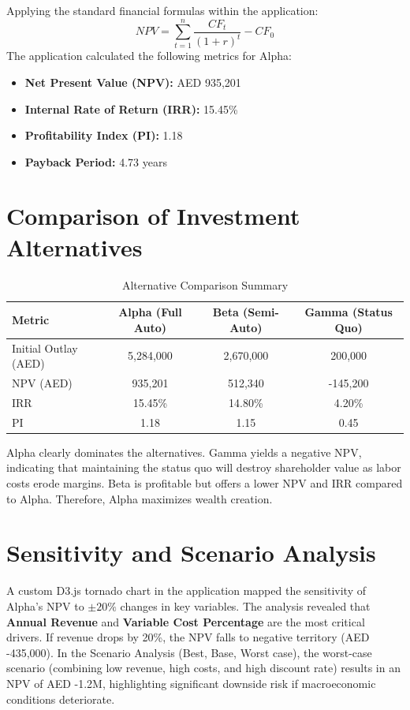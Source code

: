 \documentclass[12pt]{article}
\begin{document}
Applying the standard financial formulas within the application:
\begin{equation}
NPV = \sum_{t=1}^{n} \frac{CF_t}{(1+r)^t} - CF_0
\end{equation}
The application calculated the following metrics for Alpha:
\begin{itemize}
    \item \textbf{Net Present Value (NPV):} AED 935,201
    \item \textbf{Internal Rate of Return (IRR):} 15.45\%
    \item \textbf{Profitability Index (PI):} 1.18
    \item \textbf{Payback Period:} 4.73 years
\end{itemize}

\section{Comparison of Investment Alternatives}
\begin{table}[H]
\centering
\begin{tabular}{lccc}
\toprule
\textbf{Metric} & \textbf{Alpha (Full Auto)} & \textbf{Beta (Semi-Auto)} & \textbf{Gamma (Status Quo)} \\
\midrule
Initial Outlay (AED) & 5,284,000 & 2,670,000 & 200,000 \\
NPV (AED) & 935,201 & 512,340 & -145,200 \\
IRR & 15.45\% & 14.80\% & 4.20\% \\
PI & 1.18 & 1.15 & 0.45 \\
\bottomrule
\end{tabular}
\caption{Alternative Comparison Summary}
\end{table}
Alpha clearly dominates the alternatives. Gamma yields a negative NPV, indicating that maintaining the status quo will destroy shareholder value as labor costs erode margins. Beta is profitable but offers a lower NPV and IRR compared to Alpha. Therefore, Alpha maximizes wealth creation.

\section{Sensitivity and Scenario Analysis}
A custom D3.js tornado chart in the application mapped the sensitivity of Alpha's NPV to $\pm20\%$ changes in key variables. The analysis revealed that \textbf{Annual Revenue} and \textbf{Variable Cost Percentage} are the most critical drivers. If revenue drops by 20\%, the NPV falls to negative territory (AED -435,000). 
In the Scenario Analysis (Best, Base, Worst case), the worst-case scenario (combining low revenue, high costs, and high discount rate) results in an NPV of AED -1.2M, highlighting significant downside risk if macroeconomic conditions deteriorate.
\end{document}
